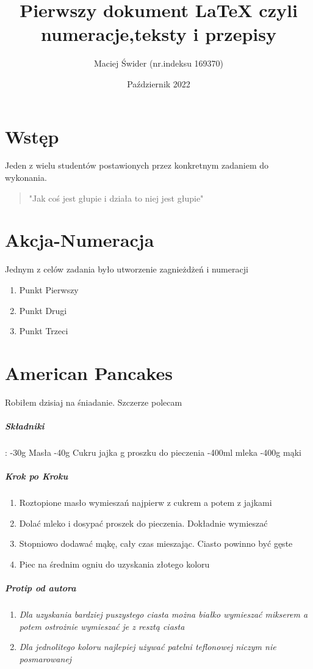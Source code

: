 \documentclass[12pt, letterpaper, titlepage]{article}
\title{Pierwszy dokument LaTeX czyli numeracje,teksty i przepisy}
\author{Maciej Świder (nr.indeksu 169370)}
\date{Październik 2022}
\begin{document}
\maketitle
\section{Wstęp}
Jeden z wielu studentów postawionych przez konkretnym zadaniem do wykonania.
\begin{quote}
"Jak coś jest głupie i działa to niej jest głupie"
\end{quote}
\section{Akcja-Numeracja}
Jednym z celów zadania było utworzenie zagnieżdżeń i numeracji
\begin{enumerate}[I]
\item Punkt Pierwszy
\item Punkt Drugi
\item Punkt Trzeci
\end{enumerate}

\section{American Pancakes}
Robiłem dzisiaj na śniadanie. Szczerze polecam
\subparagraph{Składniki} :		 \newline
-30g Masła \newline
-40g Cukru  jajka  g proszku do pieczenia \newline
-400ml mleka \newline
-400g mąki \newline
\subparagraph{Krok po Kroku}
\begin{enumerate}

\item Roztopione masło wymieszań najpierw z cukrem a potem z jajkami
\item Dolać mleko i dosypać proszek do pieczenia. Dokładnie wymieszać
\item Stopniowo dodawać mąkę, cały czas mieszając. Ciasto powinno być gęste
\item Piec na średnim ogniu do uzyskania złotego koloru
\end{enumerate}
\subparagraph{Protip od autora}
\begin{enumerate}[*]
\item \textit{Dla uzyskania bardziej puszystego ciasta można białko wymieszać mikserem a potem ostrożnie wymieszać je z resztą ciasta}
\item \textit{Dla jednolitego koloru najlepiej używać patelni teflonowej niczym nie posmarowanej}
\end{enumerate}
\end{document}
